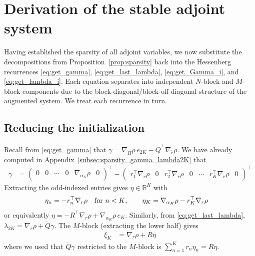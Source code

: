\documentclass[a4paper,12pt]{article}
\theoremstyle{definition}
\begin{document}
\section{Derivation of the stable adjoint system}\label{app:stable_derivation}
Having established the sparsity of all adjoint variables, we now substitute the decompositions from Proposition~\ref{prop:sparsity} back into the Hessenberg recurrences \eqref{eq:get_gamma}, \eqref{eq:get_last_lambda}, \eqref{eq:get_Gamma_i}, and \eqref{eq:get_lambda_i}. Each equation separates into independent $N$-block and $M$-block components due to the block-diagonal/block-off-diagonal structure of the augmented system. We treat each recurrence in turn.

\subsection{Reducing the initialization}
Recall from \eqref{eq:get_gamma} that $\gamma = \nabla_{\dddot{H}} \rho\, e_{2K} - \dddot{Q}^\top \nabla_{\dddot{r}} \rho$. We have already computed in Appendix~\ref{subsec:sparsity_gamma_lambda2K} that
\begin{align*}
    \gamma &= \begin{pmatrix}0 & 0 & \cdots & 0 & \nabla_{\alpha_K} \rho & 0\end{pmatrix}^\top
    - 
    \begin{pmatrix}r_1^\top \nabla_r\rho & 0 & r_2^\top \nabla_r\rho & 0 & \cdots & r_K^\top \nabla_r\rho & 0\end{pmatrix}^\top
\end{align*}
Extracting the odd-indexed entries gives $\eta \in \mathbb{R}^K$ with
\begin{align}
    \eta_n &= -r_n^\top \nabla_r\rho \text{\quad for $n < K$}, \qquad \eta_K = \nabla_{\alpha_K}\rho - r_K^\top \nabla_r\rho \label{eq:stable_eta}
\end{align}
or equivalently $\eta = -R^\top \nabla_r \rho + \nabla_{\alpha_K}\rho\, e_K$.
Similarly, from \eqref{eq:get_last_lambda}, $\lambda_{2K} = \nabla_{\dddot{r}} \rho + \dddot{Q} \gamma$. The $M$-block (extracting the lower half) gives
\begin{align}
    \xi_K &= \nabla_r \rho + R\eta \label{eq:stable_xi_K}
\end{align}
where we used that $\dddot{Q}\gamma$ restricted to the $M$-block is $\sum_{n=1}^K r_n \eta_n = R\eta$.
\end{document}

